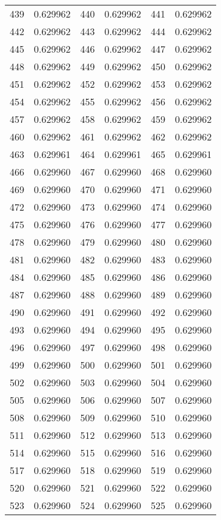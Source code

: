 \documentclass[12pt]{article}
\begin{document}
\begin{longtable}{@{}cc|cc|cc@{}}
439 & 0.629962 & 440 & 0.629962 & 441 & 0.629962 \\
442 & 0.629962 & 443 & 0.629962 & 444 & 0.629962 \\
445 & 0.629962 & 446 & 0.629962 & 447 & 0.629962 \\
448 & 0.629962 & 449 & 0.629962 & 450 & 0.629962 \\
451 & 0.629962 & 452 & 0.629962 & 453 & 0.629962 \\
454 & 0.629962 & 455 & 0.629962 & 456 & 0.629962 \\
457 & 0.629962 & 458 & 0.629962 & 459 & 0.629962 \\
460 & 0.629962 & 461 & 0.629962 & 462 & 0.629962 \\
463 & 0.629961 & 464 & 0.629961 & 465 & 0.629961 \\
466 & 0.629960 & 467 & 0.629960 & 468 & 0.629960 \\
469 & 0.629960 & 470 & 0.629960 & 471 & 0.629960 \\
472 & 0.629960 & 473 & 0.629960 & 474 & 0.629960 \\
475 & 0.629960 & 476 & 0.629960 & 477 & 0.629960 \\
478 & 0.629960 & 479 & 0.629960 & 480 & 0.629960 \\
481 & 0.629960 & 482 & 0.629960 & 483 & 0.629960 \\
484 & 0.629960 & 485 & 0.629960 & 486 & 0.629960 \\
487 & 0.629960 & 488 & 0.629960 & 489 & 0.629960 \\
490 & 0.629960 & 491 & 0.629960 & 492 & 0.629960 \\
493 & 0.629960 & 494 & 0.629960 & 495 & 0.629960 \\
496 & 0.629960 & 497 & 0.629960 & 498 & 0.629960 \\
499 & 0.629960 & 500 & 0.629960 & 501 & 0.629960 \\
502 & 0.629960 & 503 & 0.629960 & 504 & 0.629960 \\
505 & 0.629960 & 506 & 0.629960 & 507 & 0.629960 \\
508 & 0.629960 & 509 & 0.629960 & 510 & 0.629960 \\
511 & 0.629960 & 512 & 0.629960 & 513 & 0.629960 \\
514 & 0.629960 & 515 & 0.629960 & 516 & 0.629960 \\
517 & 0.629960 & 518 & 0.629960 & 519 & 0.629960 \\
520 & 0.629960 & 521 & 0.629960 & 522 & 0.629960 \\
523 & 0.629960 & 524 & 0.629960 & 525 & 0.629960 \\

\end{longtable}
\end{document}

